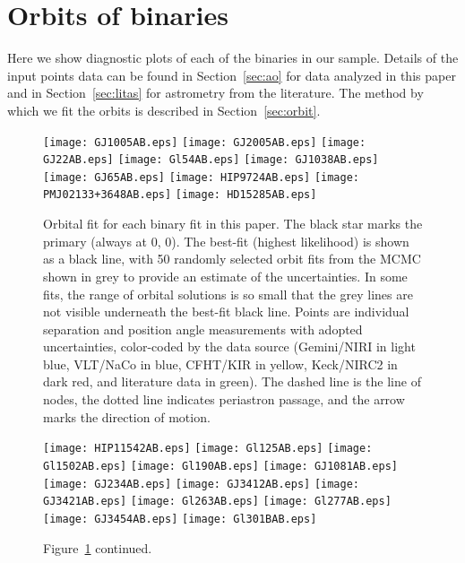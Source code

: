\documentclass[twocolumn]{aastex62}
\begin{document}
\clearpage

\section{Orbits of binaries}\label{sec:orbitplots}

Here we show diagnostic plots of each of the binaries in our sample. Details of the input points data can be found in Section~\ref{sec:ao} for data analyzed in this paper and in Section~\ref{sec:litas} for astrometry from the literature. The method by which we fit the orbits is described in Section~\ref{sec:orbit}.

\begin{figure}[htp]
\begin{center}
\texttt{[image: GJ1005AB.eps]}
\texttt{[image: GJ2005AB.eps]}
\texttt{[image: GJ22AB.eps]}
\texttt{[image: Gl54AB.eps]}
\texttt{[image: GJ1038AB.eps]}
\texttt{[image: GJ65AB.eps]}
\texttt{[image: HIP9724AB.eps]} %
\texttt{[image: PMJ02133+3648AB.eps]} 
\texttt{[image: HD15285AB.eps]} %
\caption{Orbital fit for each binary fit in this paper. The black star marks the primary (always at 0, 0). The best-fit (highest likelihood) is shown as a black line, with 50 randomly selected orbit fits from the MCMC shown in grey to provide an estimate of the uncertainties. In some fits, the range of orbital solutions is so small that the grey lines are not visible underneath the best-fit black line. Points are individual separation and position angle measurements with adopted uncertainties, color-coded by the data source (Gemini/NIRI in light blue, VLT/NaCo in blue, CFHT/KIR in yellow, Keck/NIRC2 in dark red, and literature data in green). The dashed line is the line of nodes, the dotted line indicates periastron passage, and the arrow marks the direction of motion. }
\label{fig:orbits1}
\end{center}
\end{figure}

\begin{figure}[htp]
\begin{center}
\texttt{[image: HIP11542AB.eps]} %
\texttt{[image: Gl125AB.eps]}
\texttt{[image: Gl1502AB.eps]}
\texttt{[image: Gl190AB.eps]}
\texttt{[image: GJ1081AB.eps]}
\texttt{[image: GJ234AB.eps]}
\texttt{[image: GJ3412AB.eps]}
\texttt{[image: GJ3421AB.eps]}
\texttt{[image: Gl263AB.eps]}
\texttt{[image: Gl277AB.eps]}
\texttt{[image: GJ3454AB.eps]}
\texttt{[image: Gl301BAB.eps]}
\caption{Figure~\ref{fig:orbits1} continued.}
\label{fig:orbits2}
\end{center}
\end{figure}
\end{document}
